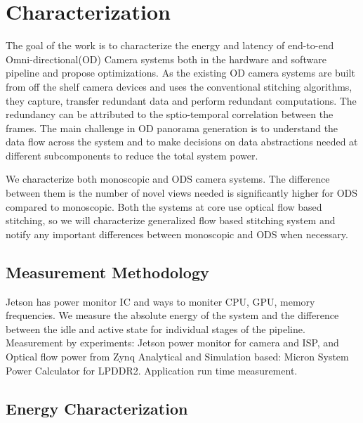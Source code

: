 \chapter{Characterization}

The goal of the work is to characterize the energy and latency of end-to-end Omni-directional(OD) Camera  systems both in the hardware and software pipeline and propose optimizations. As the existing OD camera systems are built from off the shelf camera devices and uses the conventional stitching algorithms, they capture, transfer redundant data and perform redundant computations. The redundancy can be attributed to the sptio-temporal correlation between the frames. The main challenge in OD panorama generation is to understand the data flow across the system and to make decisions on data abstractions needed at different subcomponents to reduce the total system power.

We characterize both monoscopic and ODS camera systems. The difference between them is the number of novel views needed is significantly higher for ODS compared to monoscopic. Both the systems at core use optical flow based stitching, so we will characterize generalized flow based stitching system and notify any important differences between monoscopic and ODS when necessary.\newline


\section{Measurement Methodology} %
Jetson has power monitor IC and ways to moniter CPU, GPU, memory frequencies. We measure the absolute energy of the system and the difference between the idle and active state for individual stages of the pipeline.
Measurement by experiments:
Jetson power monitor for camera and ISP, and Optical flow power from Zynq\newline
Analytical and Simulation based:
Micron System Power Calculator for LPDDR2. \newline
Application run time measurement.




\section{Energy Characterization}
